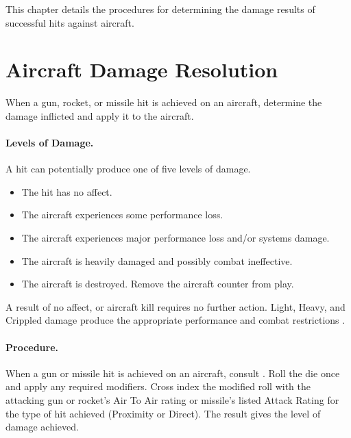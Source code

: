 

This chapter details the procedures for determining the damage results of successful hits against aircraft.

\section{Aircraft Damage Resolution}
\label{rule:aircraft-damage-resolution}

When a gun, rocket, or missile hit is achieved on an aircraft, determine the damage inflicted and apply it to the aircraft.


\paragraph{Levels of Damage.} A hit can potentially produce one of five levels of damage.

\begin{itemize}

    \item{} The hit has no affect.

    \item{} The aircraft experiences some performance loss.
    
    \item{} The aircraft experiences major performance loss and/or systems damage.

    \item{} The aircraft is heavily damaged and possibly combat ineffective.
    
    \item{} The aircraft is destroyed. Remove the aircraft counter from play.

\end{itemize}

A result of no affect, or aircraft kill requires no further action. Light, Heavy, and Crippled damage produce the appropriate performance and combat restrictions .

\paragraph{Procedure.} When a gun or missile hit is achieved on an aircraft, consult . Roll the die once and apply any required modifiers. Cross index the modified roll with the attacking gun or rocket's Air To Air rating or missile's listed Attack Rating for the type of hit achieved (Proximity or Direct). The result gives the level of damage achieved.

